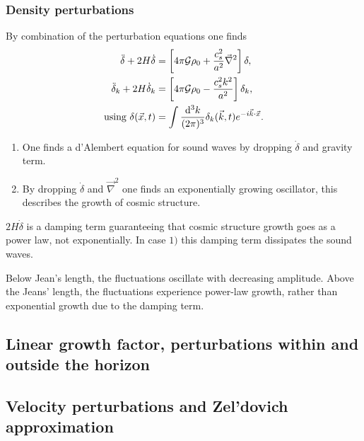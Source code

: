 \subsubsection{Density perturbations}
By combination of the perturbation equations one finds
\begin{align}
\ddot{\delta}+ 2 H \dot{\delta} &= \left[4 \pi \mathcal{G} \rho_0 + \frac{c^2_s}{a^2} \vec{\nabla}^2\right]\delta,\\
\ddot{\delta}_k + 2 H \dot{\delta}_k &= \left[4 \pi \mathcal{G} \rho_0 - \frac{c^2_s k^2}{a^2}\right]\delta_k, \nonumber \\
 \text{using       } \delta(\vec{x},t) &= \int \frac{\mathrm{d}^3 k}{(2 \pi)^3} \delta_k(\vec{k},t) e^{-i \vec{k}\cdot \vec{x}}\nonumber.
\end{align}
\begin{enumerate}
	\item One finds a d'Alembert equation for sound waves by dropping $\dot{\delta}$ and gravity term.
	\item By dropping $\dot{\delta}$ and $\vec{\nabla}^2$ one finds an exponentially growing oscillator, this describes the growth of cosmic structure.
\end{enumerate}
$2H \dot{\delta}$ is a damping term guaranteeing that cosmic structure growth goes as a power law, not exponentially. In case $1)$ this damping term dissipates the sound waves.

Below Jean's length, the fluctuations oscillate with decreasing amplitude. Above the Jeans' length, the fluctuations experience power-law growth, rather than exponential growth due to the damping term.





























\subsection{Linear growth factor, perturbations within and outside the horizon}
\subsection{Velocity perturbations and Zel'dovich approximation}
